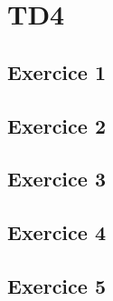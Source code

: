 \chapter{TD4}
    \section{Exercice 1}

    \section{Exercice 2}

    \section{Exercice 3}

    \section{Exercice 4}

    \section{Exercice 5}

